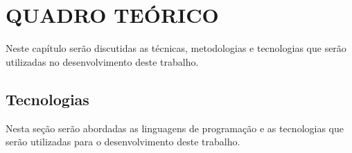 \chapter{QUADRO TEÓRICO}

\par Neste capítulo serão discutidas as técnicas, metodologias e tecnologias que serão utilizadas no desenvolvimento deste trabalho.






\section{Tecnologias}

\par Nesta seção serão abordadas as linguagens de programação e as tecnologias que serão utilizadas para o desenvolvimento deste trabalho.

























